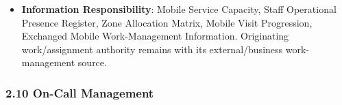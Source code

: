 \begin{itemize}
\begin{itemize}
\begin{itemize}
\item
\emph{Terminology}: External “work/\allowbreak{}task” vocabulary does not make human work a Harmonia Task. Work Order means human doing; To Do means human review/\allowbreak{}update/\allowbreak{}approval; Task means synthetic task. The preferred Strategy name \texttt{} remains a proposed naming correction pending human confirmation, not a new Feature or alias.



\end{itemize}


\end{itemize}


\item
\textbf{Information Responsibility}: Mobile Service Capacity, Staff Operational Presence Register, Zone Allocation Matrix, Mobile Visit Progression, Exchanged Mobile Work-Management Information. Originating work/\allowbreak{}assignment authority remains with its external/\allowbreak{}business work-management source.



\end{itemize}
\label{rad:hso:208}

\par\smallskip
{}\label{rad:hso:210}
\subsubsection*{2.10 On-Call Management}
\label{rad:hso:211}

